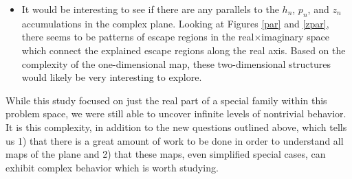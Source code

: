 \begin{itemize}
	\item It would be interesting to see if there are any parallels to the $h_n$, $p_n$, and $z_n$ accumulations in the complex plane. Looking at Figures \ref{par} and \ref{zpar}, there seems to be patterns of escape regions in the real$\times$imaginary space which  connect the explained escape regions along the real axis. Based on the complexity of the one-dimensional map, these two-dimensional structures would likely be very interesting to explore.

\end{itemize}

 While this study focused on just the real part of a special family within this problem space, we were still able to uncover infinite levels of nontrivial behavior. It is this complexity, in addition to the new questions outlined above, which tells us 1) that there is a great amount of work to be done in order to understand all maps of the plane and 2) that these maps, even simplified special cases, can exhibit complex behavior which is worth studying.